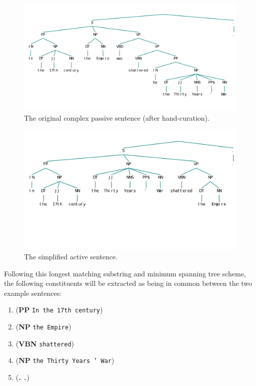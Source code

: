 \documentclass{article}
\begin{document}
\begin{figure}
\begin{center}
\includegraphics[scale=.65]{comp_pass}
\caption{The original complex passive sentence (after hand-curation).}
\end{center}
\end{figure}


\begin{figure}
\begin{center}
\includegraphics[scale=.65]{simp_pass}
\caption{The simplified active sentence.}
\end{center}
\end{figure}

Following this longest matching substring and minimum spanning tree scheme, the following constituents will be extracted as being in common between the two example sentences:

\begin{enumerate}
\item (\textbf{PP} \texttt{In the 17th century})
\item (\textbf{NP} \texttt{the Empire})
\item (\textbf{VBN} \texttt{shattered})
\item (\textbf{NP} \texttt{the Thirty Years ' War})
\item (\textbf{.} \texttt{.})
\end{enumerate}
\end{document}
